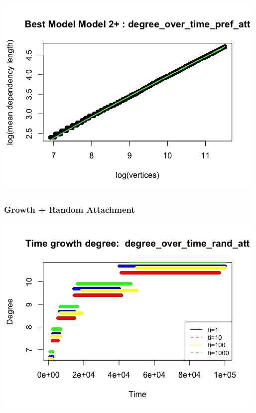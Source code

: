 \documentclass[12pt, a4paper]{article}
\begin{document}
\begin{minipage}[t]{\linewidth}
    \includegraphics[width=\textwidth]{time_growth_degree_best_fit_pref_att}
    \captionsetup{type=figure}
    \label{fig:time_growth_degree_best_fit_pref_att}
  \end{minipage}


\subsubsection{Growth + Random Attachment}

\begin{minipage}[t]{\linewidth}
    \includegraphics[width=\textwidth]{time_growth_degree_rand_att}
    \captionsetup{type=figure}
    \label{fig:time_growth_degree_rand_att}
  \end{minipage}
\end{document}
